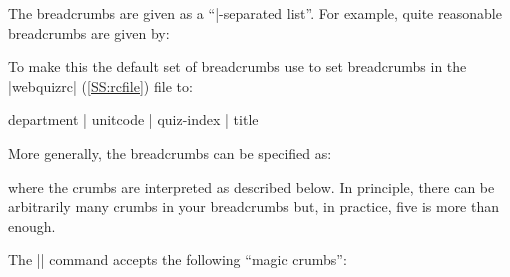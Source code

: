 \documentclass[svgnames]{article}
\newcommand\webquizrc{\index{webquizrc}%
  \BashCode|webquizrc| (\autoref{SS:rcfile})\xspace%
}
\begin{document}
  The breadcrumbs are given as a ``|-separated list''. For example,
  quite reasonable breadcrumbs are given by:
  \begin{latexcode}
  \end{latexcode}
  To make this the default set of breadcrumbs use
   to set breadcrumbs
  in the \webquizrc file to:
  \begin{latexcode}
     department | unitcode | quiz-index | title
  \end{latexcode}
  More generally, the breadcrumbs can be specified as:
  \begin{latexcode}
  \end{latexcode}
  where the crumbs are interpreted as described below.
  In principle, there can be arbitrarily many crumbs in your
  breadcrumbs but, in practice, five is more than enough.

  The \LatexCode|\BreadCrumbs| command accepts the following ``magic crumbs'':
\end{document}
